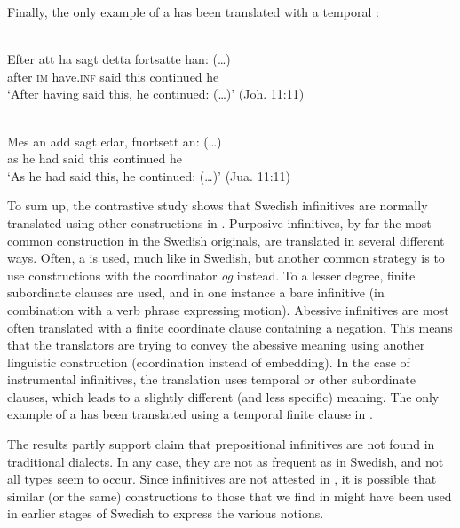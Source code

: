 \documentclass[output=paper]{langscibook}
\begin{document}
Finally, the only example of a  has been translated with a temporal : 


\ea
\label{ex:kalm:30}
\ea {}\label{ex:kalm:30a}\\ 
\gll Efter att ha sagt detta fortsatte han: (…)\\
 after \textsc{im} have.\textsc{inf} said this continued he\\
\glt ‘After having said this, he continued: (…)’ (Joh. 11:11)

\ex {}\label{ex:kalm:30b}\\
\gll Mes an add sagt edar, fuortsett an: (…)\\
 as he had said this continued he\\
\glt ‘As he had said this, he continued: (…)’ (Jua. 11:11)
\z
\z 


To sum up, the contrastive study shows that Swedish  infinitives are normally translated using other constructions in . Purposive infinitives, by far the most common construction in the Swedish originals, are translated in several different ways. Often, a  is used, much like in Swedish, but another common strategy is to use constructions with the coordinator \textit{og} instead. To a lesser degree, finite subordinate clauses are used, and in one instance a bare infinitive (in combination with a verb phrase expressing motion). Abessive infinitives are most often translated with a finite coordinate clause containing a negation. This means that the translators are trying to convey the abessive meaning using another linguistic construction (coordination instead of embedding). In the case of instrumental infinitives, the translation uses temporal or other subordinate clauses, which leads to a slightly different (and less specific) meaning. The only example of a  has been translated using a temporal finite clause in . 

The results partly support  claim that prepositional infinitives are not found in traditional dialects. In any case, they are not as frequent as in Swedish, and not all types seem to occur. Since  infinitives are not attested in , it is possible that similar (or the same) constructions to those that we find in  might have been used in earlier stages of Swedish to express the various  notions. 
\end{document}
